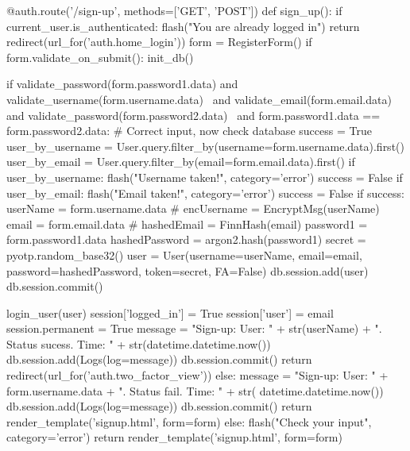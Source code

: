 \begin{python}
@auth.route('/sign-up', methods=['GET', 'POST'])
def sign_up():
    if current_user.is_authenticated:
        flash("You are already logged in")
        return redirect(url_for('auth.home_login'))
    form = RegisterForm()
    if form.validate_on_submit():
        init_db()

        if validate_password(form.password1.data) and validate_username(form.username.data) \
                and validate_email(form.email.data) and validate_password(form.password2.data) \
                and form.password1.data == form.password2.data:
            # Correct input, now check database
            success = True
            user_by_username = User.query.filter_by(username=form.username.data).first()
            user_by_email = User.query.filter_by(email=form.email.data).first()
            if user_by_username:
                flash("Username  taken!", category='error')
                success = False
            if user_by_email:
                flash("Email taken!", category='error')
                success = False
            if success:
                userName = form.username.data
                # encUsername = EncryptMsg(userName)
                email = form.email.data
                # hashedEmail = FinnHash(email)
                password1 = form.password1.data
                hashedPassword = argon2.hash(password1)
                secret = pyotp.random_base32()
                user = User(username=userName, email=email, password=hashedPassword, token=secret, FA=False)
                db.session.add(user)
                db.session.commit()

                login_user(user)
                session['logged_in'] = True
                session['user'] = email
                session.permanent = True
                message = "Sign-up: User: " + str(userName) + ". Status sucess. Time: " + str(datetime.datetime.now())
                db.session.add(Logs(log=message))
                db.session.commit()
                return redirect(url_for('auth.two_factor_view'))
            else:
                message = "Sign-up: User: " + form.username.data + ". Status fail. Time: " + str(
                    datetime.datetime.now())
                db.session.add(Logs(log=message))
                db.session.commit()
                return render_template('signup.html', form=form)
        else:
            flash("Check your input", category='error')
    return render_template('signup.html', form=form)
\end{python}

